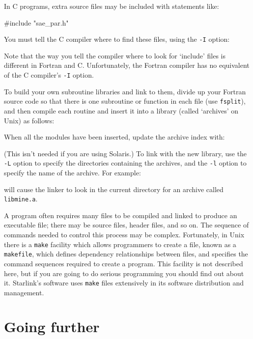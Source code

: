 \documentclass[twoside,11pt,nolof]{starlink}
\begin{document}
In C programs, extra source files may be included with statements like:
\begin{terminalv}
#include "sae_par.h"
\end{terminalv}
You must tell the C compiler where to find these files, using the \texttt{-I}
option:
\begin{terminalv}
\end{terminalv}
Note that the way you tell the compiler where to look for `include' files is
different in Fortran and C.
Unfortunately, the Fortran compiler has no equivalent of the C compiler's
\texttt{-I} option.

To build your own subroutine libraries and link to them, divide up your
Fortran source code so that there is one subroutine or function in each file
(use \texttt{fsplit}), and then compile each routine and insert it into a library
(called `archives' on Unix) as follows:
\begin{terminalv}
\end{terminalv}
When all the modules have been inserted, update the archive index with:
\begin{terminalv}
\end{terminalv}
(This isn't needed if you are using Solaris.)
To link with the new library, use the \texttt{-L} option to specify the directories
containing the archives, and the \texttt{-l} option to specify the name of the
archive.
For example:
\begin{terminalv}
\end{terminalv}
will cause the linker to look in the current directory for an archive called
\texttt{libmine.a}.

A program often requires many files to be compiled and linked to produce an
executable file; there may be source files, header files, and so on.
The sequence of commands needed to control this process may be complex.
Fortunately, in Unix there is a \texttt{make} facility which allows programmers to
create a file, known as a \texttt{makefile}, which defines dependency
relationships between files, and specifies the command sequences required to
create a program.
This facility is not described here, but if you are going to do serious
programming you should find out about it.
Starlink's software uses \texttt{make} files extensively in its software
distribution and management.

\newpage

\section{Going further}
\end{document}
